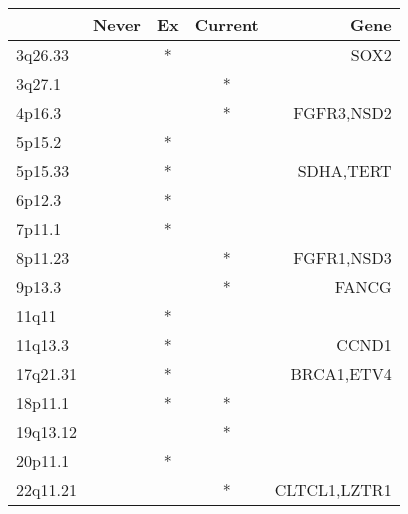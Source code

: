 \begin{tabular}{lcccr}
\toprule
{} & Never & Ex & Current &          Gene \\
\midrule
3q26.33  &       &  * &         &          SOX2 \\
3q27.1   &       &    &       * &               \\
4p16.3   &       &    &       * &    FGFR3,NSD2 \\
5p15.2   &       &  * &         &               \\
5p15.33  &       &  * &         &     SDHA,TERT \\
6p12.3   &       &  * &         &               \\
7p11.1   &       &  * &         &               \\
8p11.23  &       &    &       * &    FGFR1,NSD3 \\
9p13.3   &       &    &       * &         FANCG \\
11q11    &       &  * &         &               \\
11q13.3  &       &  * &         &         CCND1 \\
17q21.31 &       &  * &         &    BRCA1,ETV4 \\
18p11.1  &       &  * &       * &               \\
19q13.12 &       &    &       * &               \\
20p11.1  &       &  * &         &               \\
22q11.21 &       &    &       * &  CLTCL1,LZTR1 \\
\bottomrule
\end{tabular}
